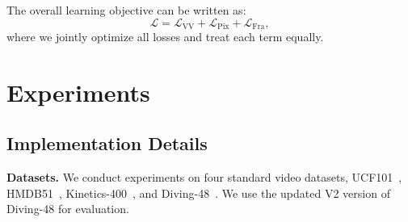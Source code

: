 \documentclass[sigconf,screen]{acmart}
\begin{document}
The overall learning objective can be written as:
\begin{equation} \label{eq11}
\mathcal{L}=\mathcal{L}_{\mathrm{VV}}+\mathcal{L}_{\mathrm{Pix}} + \mathcal{L}_{\mathrm{Fra}},
\end{equation}
where we jointly optimize all losses and treat each term equally.
\begin{table}[tbp]
\LARGE
\renewcommand\arraystretch{1.05}
\centering
\caption{Ablation study on the loss designs.}
\label{AblationLoss}
\end{table}

\section{Experiments}

\subsection{Implementation Details}
\noindent
{\bf Datasets.} We conduct experiments on four standard video datasets, UCF101~\cite{UCF101}, HMDB51~\cite{HMDB51}, Kinetics-400~\cite{Kinetics}, and Diving-48~\cite{Diving48}. We use the updated V2 version of Diving-48 for evaluation.
\end{document}
